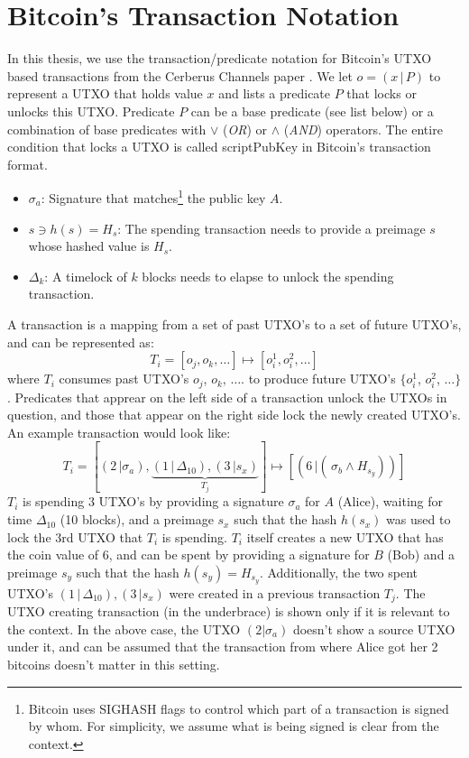 \section{Bitcoin's Transaction Notation}
In this thesis, we use the transaction/predicate notation for Bitcoin's UTXO based transactions from the Cerberus Channels paper \cite{cerberus}. We let $o = (x\,|\,P)$ to represent a UTXO that holds value $x$ and lists a predicate $P$ that locks or unlocks this UTXO. Predicate $P$ can be a base predicate (see list below) or a combination of base predicates with $\lor$ (\textit{OR}) or $\land$ (\textit{AND}) operators. The entire condition that locks a UTXO is called scriptPubKey in Bitcoin's transaction format.
\begin{itemize}
    \item $\sigma_a$: Signature that matches\footnote{Bitcoin uses SIGHASH flags to control which part of a transaction is signed by whom. For simplicity, we assume what is being signed is clear from the context.} the public key $A$.
    \item $s \ni h(s) = H_s$: The spending transaction needs to provide a preimage $s$ whose hashed value is $H_s$.
    \item $\Delta_k$: A timelock of $k$ blocks needs to elapse to unlock the spending transaction.
\end{itemize}
A transaction is a mapping from a set of past UTXO's to a set of future UTXO's, and can be represented as:
$$T_i = [o_j, o_k, \ldots] \mapsto [o_i^1, o_i^2, \ldots]$$
where $T_i$ consumes past UTXO's $o_j$, $o_k$, $\ldots$. to produce future UTXO's $\{o_i^1$, $o_i^2$, $\ldots\}$. Predicates that apprear on the left side of a transaction unlock the UTXOs in question, and those that appear on the right side lock the newly created UTXO's. An example transaction would look like:
$$T_i = [(2\,|\sigma_a), \underbrace{(1\,|\,\Delta_{10}), (3\,|s_x)}_{T_j}] \mapsto [(6\,|(\,\sigma_b \land H_{s_y}))]$$
$T_i$ is spending 3 UTXO's by providing a signature $\sigma_a$ for $A$ (Alice), waiting for time $\Delta_{10}$ (10 blocks), and a preimage $s_x$ such that the hash $h(s_x)$ was used to lock the 3rd UTXO that $T_i$ is spending. $T_i$ itself creates a new UTXO that has the coin value of 6, and can be spent by providing a signature for $B$ (Bob) and a preimage $s_y$ such that the hash $h(s_y) = H_{s_y}$. Additionally, the two spent UTXO's $(1\,|\,\Delta_{10}), (3\,|s_x)$ were created in a previous transaction $T_j$. The UTXO creating transaction (in the underbrace) is shown only if it is relevant to the context. In the above case, the UTXO $(2|\sigma_a)$ doesn't show a source UTXO under it, and can be assumed that the transaction from where Alice got her 2 bitcoins doesn't matter in this setting. 

